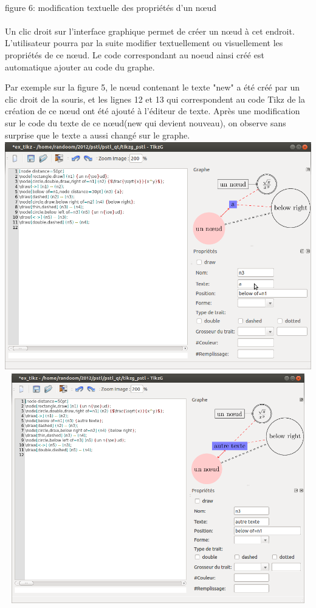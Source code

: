 \documentclass[a4paper]{report}
\begin{document}
\\
figure 6: modification textuelle des propriétés d'un n{\oe}ud
\\
\\
Un clic droit sur l'interface graphique permet de créer un n{\oe}ud à cet endroit. L'utilisateur pourra par la suite modifier textuellement ou visuellement les propriétés de ce n{\oe}ud. Le code correspondant au noeud ainsi créé est automatique ajouter au code du graphe. 

Par exemple sur la figure 5, le n{\oe}ud contenant le texte "new" a été créé par un clic droit de la souris, et les  lignes 12 et 13 qui correspondent au code Tikz de la création de ce n{\oe}ud ont été ajouté à l'éditeur de texte. Après une modification sur le code du texte de ce n{\oe}ud(new qui devient nouveau), on observe sans surprise que le texte a aussi changé sur le graphe.
\newline
  \includegraphics[width=15cm, height=10cm]{img/r_8.png} 
\\
  \includegraphics[width=15cm, height=10cm]{img/r_9.png}
\end{document}
